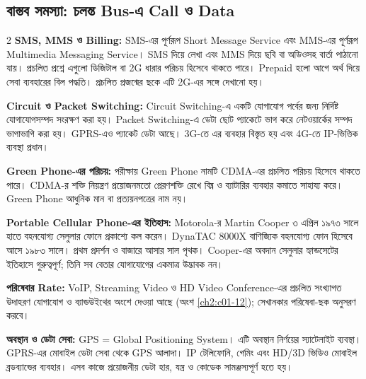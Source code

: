 \subsection{বাস্তব সমস্যা: চলন্ত Bus-এ Call ও Data}
\begin{multicols}{2}
\textbf{SMS, MMS ও Billing:} SMS-এর পূর্ণরূপ Short Message Service এবং MMS-এর পূর্ণরূপ Multimedia Messaging Service। SMS দিয়ে লেখা এবং MMS দিয়ে ছবি বা অডিওসহ বার্তা পাঠানো যায়। প্রচলিত প্রশ্নে এগুলো ডিজিটাল বা 2G ধারার পরিচয় হিসেবে থাকতে পারে। Prepaid হলো আগে অর্থ দিয়ে সেবা ব্যবহারের বিল পদ্ধতি। প্রচলিত প্রজন্মের ছকে এটি 2G-এর সঙ্গে দেখানো হয়।\par
\textbf{Circuit ও Packet Switching:} Circuit Switching-এ একটি যোগাযোগ পর্বের জন্য নির্দিষ্ট যোগাযোগসম্পদ সংরক্ষণ করা হয়। Packet Switching-এ ডেটা ছোট প্যাকেটে ভাগ করে নেটওয়ার্কের সম্পদ ভাগাভাগি করা হয়। GPRS-এও প্যাকেট ডেটা আছে। 3G-তে এর ব্যবহার বিস্তৃত হয় এবং 4G-তে IP-ভিত্তিক ব্যবস্থা প্রধান।\par
\textbf{Green Phone-এর পরিচয়:} পরীক্ষায় Green Phone নামটি CDMA-এর প্রচলিত পরিচয় হিসেবে থাকতে পারে। CDMA-র শক্তি নিয়ন্ত্রণ প্রয়োজনমতো প্রেরণশক্তি রেখে বিঘ্ন ও ব্যাটারির ব্যবহার কমাতে সাহায্য করে। Green Phone আধুনিক মান বা প্রত্যয়নপত্রের নাম নয়।\par
\textbf{Portable Cellular Phone-এর ইতিহাস:} Motorola-র Martin Cooper ৩ এপ্রিল ১৯৭৩ সালে হাতে বহনযোগ্য সেলুলার ফোনে প্রকাশ্যে কল করেন। DynaTAC 8000X বাণিজ্যিক বহনযোগ্য ফোন হিসেবে আসে ১৯৮৩ সালে। প্রথম প্রদর্শন ও বাজারে আসার সাল পৃথক। Cooper-এর অবদান সেলুলার হ্যান্ডসেটের ইতিহাসে গুরুত্বপূর্ণ; তিনি সব বেতার যোগাযোগের একমাত্র উদ্ভাবক নন।\par
\end{multicols}
\textbf{পরিষেবার Rate:} VoIP, Streaming Video ও HD Video Conference-এর প্রচলিত সংখ্যাগত উদাহরণ যোগাযোগ ও ব্যান্ডউইথের অংশে দেওয়া আছে (অংশ \ref{ch2:c01-12}); সেখানকার পরিষেবা-ছক অনুসরণ করবে।

\textbf{অবস্থান ও ডেটা সেবা:} GPS = Global Positioning System। এটি অবস্থান নির্ণয়ের স্যাটেলাইট ব্যবস্থা। GPRS-এর মোবাইল ডেটা সেবা থেকে GPS আলাদা। IP টেলিফোনি, গেমিং এবং HD/3D ভিডিও মোবাইল ব্রডব্যান্ডের ব্যবহার। এসব কাজে প্রয়োজনীয় ডেটা হার, যন্ত্র ও কোডেক সামঞ্জস্যপূর্ণ হতে হয়।
